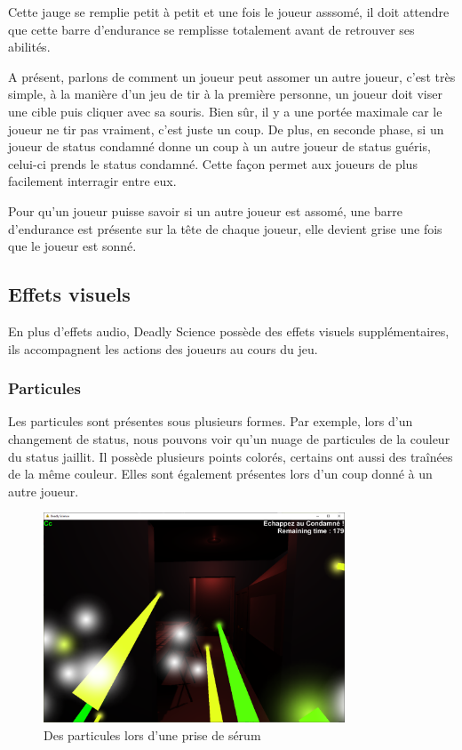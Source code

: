 \documentclass{article}
\begin{document}
Cette jauge se remplie petit à petit et une fois le joueur asssomé, il doit attendre que cette barre d'endurance se remplisse totalement avant de retrouver ses abilités.

A présent, parlons de comment un joueur peut assomer un autre joueur, c'est très simple, à la manière d'un jeu de tir à la première personne, un joueur doit viser une cible puis cliquer avec sa souris. Bien sûr, il y a une portée maximale car le joueur ne tir pas vraiment, c'est juste un coup. De plus, en seconde phase, si un joueur de status condamné donne un coup à un autre joueur de status guéris, celui-ci prends le status condamné. Cette façon permet aux joueurs de plus facilement interragir entre eux.

Pour qu'un joueur puisse savoir si un autre joueur est assomé, une barre d'endurance est présente sur la tête de chaque joueur, elle devient grise une fois que le joueur est sonné.

\subsection{Effets visuels}

En plus d'effets audio, Deadly Science possède des effets visuels supplémentaires, ils accompagnent les actions des joueurs au cours du jeu.

\subsubsection{Particules}

Les particules sont présentes sous plusieurs formes.
Par exemple, lors d'un changement de status, nous pouvons voir qu'un nuage de particules de la couleur du status jaillit. Il possède plusieurs points colorés, certains ont aussi des traînées de la même couleur.
Elles sont également présentes lors d'un coup donné à un autre joueur.

\begin{figure}[H]
    \centering
    \includegraphics[width=0.8\textwidth]{cc/particles_example.png}
    \caption{Des particules lors d'une prise de sérum}
    \label{cc_c}
\end{figure}
\end{document}
